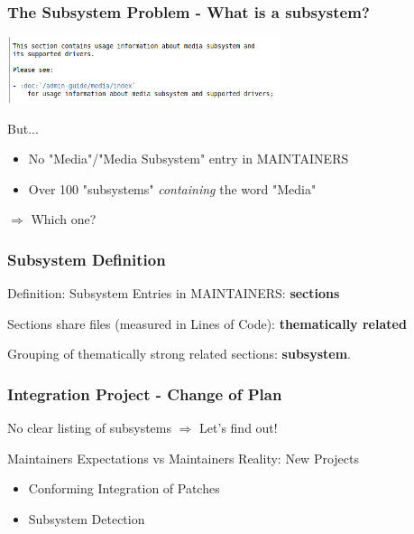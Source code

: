 \documentclass{beamer}
\begin{document}
	\begin{frame}
	\frametitle{The Subsystem Problem - What is a subsystem?}
	\begin{center}
     	\includegraphics[width=0.6\textwidth]{pics/Media_subsystem.png}
	\end{center}

	\begin{block}{But... }
		\begin{itemize}
		\item No "Media"/"Media Subsystem" entry in MAINTAINERS
		\item Over 100 "subsystems" \textit{containing} the word "Media"
		\end{itemize}
	\end{block}
	\begin{center}
	$\Rightarrow$ Which one?
	\end{center}
	\end{frame}

	\begin{frame} 
	\frametitle{Subsystem Definition}
		\begin{block}{Definition: Subsystem}
			Entries in MAINTAINERS: \textbf{sections}

			Sections share files (measured in Lines of Code): \textbf{thematically related}

			Grouping of thematically strong related sections: \textbf{subsystem}.

		\end{block}
	\end{frame}

	\begin{frame}
	\frametitle{Integration Project - Change of Plan}
		\begin{block}{No clear listing of subsystems}
			$\Rightarrow$ Let's find out!
		\end{block}



		\begin{block}{Maintainers Expectations vs Maintainers Reality: New Projects}
			\begin{itemize}
				\item Conforming Integration of Patches
				\item Subsystem Detection
			\end{itemize}
		\end{block}
	\end{frame}
\end{document}
